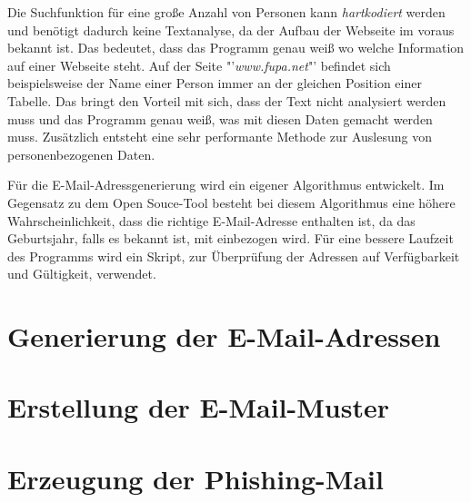 Die Suchfunktion für eine große Anzahl von Personen kann \textit{hartkodiert} werden und benötigt dadurch keine Textanalyse, da der Aufbau der Webseite im voraus bekannt ist. Das bedeutet, dass das Programm genau weiß wo welche Information auf einer Webseite steht. Auf der Seite "'\textit{www.fupa.net}"' befindet sich beispielsweise der Name einer Person immer an der gleichen Position einer Tabelle. Das bringt den Vorteil mit sich, dass der Text nicht analysiert werden muss und das Programm genau weiß, was mit diesen Daten gemacht werden muss. Zusätzlich entsteht eine sehr performante Methode zur Auslesung von personenbezogenen Daten.

Für die E-Mail-Adressgenerierung wird ein eigener Algorithmus entwickelt. Im Gegensatz zu dem Open Souce-Tool \cite{Bazzell} besteht bei diesem Algorithmus eine höhere Wahrscheinlichkeit, dass die richtige E-Mail-Adresse enthalten ist, da das Geburtsjahr, falls es bekannt ist, mit einbezogen wird. Für eine bessere Laufzeit des Programms wird ein Skript, zur Überprüfung der Adressen auf Verfügbarkeit und Gültigkeit, verwendet.

\section{Generierung der E-Mail-Adressen}

\section{Erstellung der E-Mail-Muster}

\section{Erzeugung der Phishing-Mail}